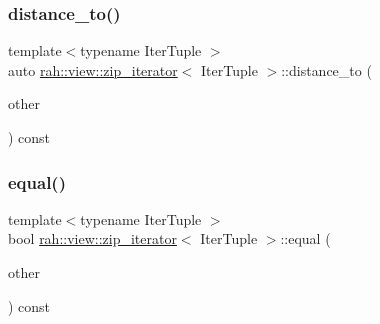 \mbox{\label{structrah_1_1view_1_1zip__iterator_a01c298bede994df318d47205c50cc461}} 
\subsubsection{\texorpdfstring{distance\_to()}{distance\_to()}\hspace{0.1cm}{\footnotesize\ttfamily [2/2]}}
{\footnotesize\ttfamily template$<$typename Iter\+Tuple $>$ \\
auto \mbox{\hyperlink{structrah_1_1view_1_1zip__iterator}{rah\+::view\+::zip\+\_\+iterator}}$<$ Iter\+Tuple $>$\+::distance\+\_\+to (\begin{DoxyParamCaption}\item[{\mbox{\hyperlink{structrah_1_1view_1_1zip__iterator}{zip\+\_\+iterator}}$<$ Iter\+Tuple $>$}]{other }\end{DoxyParamCaption}) const\hspace{0.3cm}{\ttfamily [inline]}}

\mbox{\label{structrah_1_1view_1_1zip__iterator_ab8712d7266cdc63143e61841fa371179}} 
\subsubsection{\texorpdfstring{equal()}{equal()}\hspace{0.1cm}{\footnotesize\ttfamily [1/2]}}
{\footnotesize\ttfamily template$<$typename Iter\+Tuple $>$ \\
bool \mbox{\hyperlink{structrah_1_1view_1_1zip__iterator}{rah\+::view\+::zip\+\_\+iterator}}$<$ Iter\+Tuple $>$\+::equal (\begin{DoxyParamCaption}\item[{\mbox{\hyperlink{structrah_1_1view_1_1zip__iterator}{zip\+\_\+iterator}}$<$ Iter\+Tuple $>$}]{other }\end{DoxyParamCaption}) const\hspace{0.3cm}{\ttfamily [inline]}}

